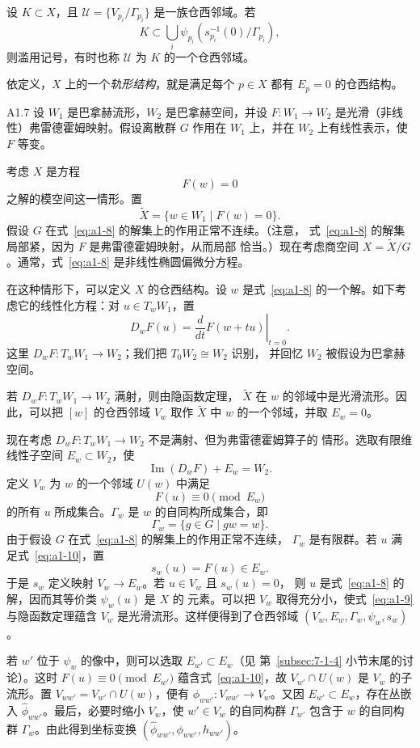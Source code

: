 设 $K\subset X$，且
$\mathcal U=\{V_{p_i}/\Gamma_{p_i}\}$ 是一族仓西邻域。若
\[
 K\subset\bigcup_i\psi_{p_i}(s_{p_i}^{-1}(0)/\Gamma_{p_i}),
\]
则滥用记号，有时也称 $\mathcal U$ 为 $K$ 的一个仓西邻域。

依定义，$X$ 上的一个\emph{轨形结构}，就是满足每个 $p\in X$ 都有
$E_p=0$ 的仓西结构。

\begin{example}{A1.7}\label{ex:a1-7}
设 $W_1$ 是巴拿赫流形，$W_2$ 是巴拿赫空间，并设
$F\colon W_1\to W_2$ 是光滑（非线性）弗雷德霍姆映射。假设离散群 $G$
作用在 $W_1$ 上，并在 $W_2$ 上有线性表示，使 $F$ 等变。

考虑 $X$ 是方程
\begin{equation}
 F(w)=0
 \tag{A1.8}\label{eq:a1-8}
\end{equation}
之解的模空间这一情形。置
\[
 \widetilde X=\{w\in W_1\mid F(w)=0\}.
\]
假设 $G$ 在式~\eqref{eq:a1-8} 的解集上的作用正常不连续。（注意，
式~\eqref{eq:a1-8} 的解集局部紧，因为 $F$ 是弗雷德霍姆映射，从而局部
恰当。）现在考虑商空间 $X=\widetilde X/G$。通常，式~\eqref{eq:a1-8}
是非线性椭圆偏微分方程。

在这种情形下，可以定义 $X$ 的仓西结构。设 $w$ 是式~\eqref{eq:a1-8}
的一个解。如下考虑它的线性化方程：对 $u\in T_wW_1$，置
\[
 D_wF(u)=\left.\frac{d}{dt}F(w+tu)\right|_{t=0}.
\]
这里 $D_wF\colon T_wW_1\to W_2$；我们把 $T_0W_2\cong W_2$ 识别，
并回忆 $W_2$ 被假设为巴拿赫空间。

若 $D_wF\colon T_wW_1\to W_2$ 满射，则由隐函数定理，
$\widetilde X$ 在 $w$ 的邻域中是光滑流形。因此，可以把 $[w]$ 的仓西邻域
$V_w$ 取作 $\widetilde X$ 中 $w$ 的一个邻域，并取 $E_w=0$。

现在考虑 $D_wF\colon T_wW_1\to W_2$ 不是满射、但为弗雷德霍姆算子的
情形。选取有限维线性子空间 $E_w\subset W_2$，使
\begin{equation}
 \operatorname{Im}(D_wF)+E_w=W_2.
 \tag{A1.9}\label{eq:a1-9}
\end{equation}
定义 $V_w$ 为 $w$ 的一个邻域 $U(w)$ 中满足
\begin{equation}
 F(u)\equiv0\pmod{E_w}
 \tag{A1.10}\label{eq:a1-10}
\end{equation}
的所有 $u$ 所成集合。$\Gamma_w$ 是 $w$ 的自同构所成集合，即
\[
 \Gamma_w=\{g\in G\mid gw=w\}.
\]
由于假设 $G$ 在式~\eqref{eq:a1-8} 的解集上的作用正常不连续，
$\Gamma_w$ 是有限群。若 $u$ 满足式~\eqref{eq:a1-10}，置
\[
 s_w(u)=F(u)\in E_w.
\]
于是 $s_w$ 定义映射 $V_w\to E_w$。若 $u\in V_w$ 且 $s_w(u)=0$，
则 $u$ 是式~\eqref{eq:a1-8} 的解，因而其等价类 $\psi_w(u)$ 是 $X$ 的
元素。可以把 $V_w$ 取得充分小，使式~\eqref{eq:a1-9} 与隐函数定理蕴含
$V_w$ 是光滑流形。这样便得到了仓西邻域
$(V_w,E_w,\Gamma_w,\psi_w,s_w)$。

若 $w'$ 位于 $\psi_w$ 的像中，则可以选取 $E_{w'}\subset E_w$（见
第~\ref{subsec:7-1-4} 小节末尾的讨论）。这时
$F(u)\equiv0\pmod{E_{w'}}$ 蕴含式~\eqref{eq:a1-10}，故
$V_{w'}\cap U(w)$ 是 $V_w$ 的子流形。置
$V_{ww'}=V_{w'}\cap U(w)$，便有
$\phi_{ww'}\colon V_{ww'}\to V_w$。又因 $E_{w'}\subset E_w$，存在丛嵌入
$\widehat\phi_{ww'}$。最后，必要时缩小 $V_w$，使 $w'\in V_w$ 的自同构群
$\Gamma_{w'}$ 包含于 $w$ 的自同构群 $\Gamma_w$。由此得到坐标变换
$(\widehat\phi_{ww'},\phi_{ww'},h_{ww'})$。
\end{example}

